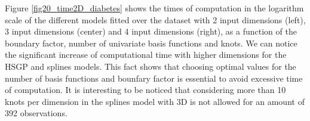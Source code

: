 \documentclass[]{interact}
\theoremstyle{plain}%
\theoremstyle{definition}
\theoremstyle{remark}
\begin{document}
Figure \ref{fig20_time2D_diabetes} shows the times of computation in the logarithm scale of the different models fitted over the dataset with 2 input dimensions (left), 3 input dimensions (center) and 4 input dimensions (right), as a function of the boundary factor, number of univariate basis functions and knots. We can notice the significant increase of computational time with higher dimensions for the HSGP and splines models. This fact shows that choosing optimal values for the number of basis functions and bounfary factor is essential to avoid excessive time of computation. It is interesting to be noticed that considering more than 10 knots per dimension in the splines model with 3D is not allowed for an amount of 392 observations.

\begin{figure}
\centering
{}

\end{figure}
\end{document}
